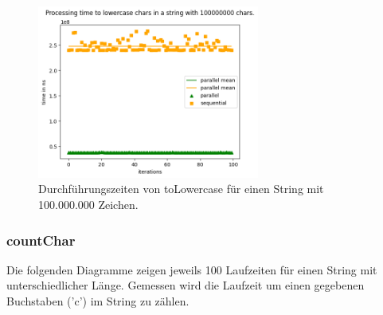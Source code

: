 \documentclass[plainarticle,zihtitle,german,final,hyperref,utf8]{zihpub}
\begin{document}
\begin{figure}[h]
	\begin{center}
		\includegraphics[width=0.65\textwidth]{images/comp_lower_100000000.png}
		\caption{Durchführungszeiten von toLowercase für einen String mit 100.000.000 Zeichen.}
	\end{center}
\end{figure}

\clearpage
\subsubsection{countChar}
Die folgenden Diagramme zeigen jeweils 100 Laufzeiten für einen String mit unterschiedlicher Länge. Gemessen wird die Laufzeit um einen gegebenen Buchstaben ('c') im String zu zählen.
\end{document}
